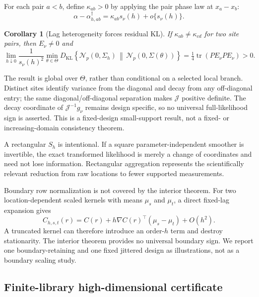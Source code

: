 \documentclass[11pt]{article}
\newtheorem{corollary}{Corollary}
\theoremstyle{remark}
\newcommand{\tr}{\operatorname{tr}}
\newcommand{\KL}{D_{\mathrm{KL}}}
\newcommand{\Normal}{\mathcal N}
\begin{document}
For each pair \(a<b\), define \(\kappa_{ab}>0\) by applying the pair phase law
at \(x_a-x_b\):
\begin{equation}
 \alpha-\alpha_{h,ab}^\dagger
 =\kappa_{ab}s_\nu(h)+o\{s_\nu(h)\}.
 \label{eq:finite-pair-coefficient}
\end{equation}
\begin{corollary}[Lag heterogeneity forces residual KL]
\label{cor:full-likelihood-lag-heterogeneity}
If \(\kappa_{ab}\ne\kappa_{cd}\) for two site pairs, then \(E_\nu\ne0\) and
\begin{equation}
 \lim_{h\downarrow0}\frac{1}{s_\nu(h)^2}
 \min_{\theta\in\Theta}\KL\!\left\{\Normal_p(0,\Sigma_h)\,\middle\|\,
 \Normal_p(0,\Sigma(\theta))\right\}
 =\tfrac14\tr(PE_\nu PE_\nu)>0.
 \label{eq:finite-positive-full-kl}
\end{equation}
\end{corollary}

The result is global over \(\Theta\), rather than conditional on a selected
local branch. Distinct sites identify variance from the diagonal and decay
from any off-diagonal entry; the same diagonal/off-diagonal separation makes
\(\mathcal J\) positive definite. The decay coordinate of
\(\mathcal J^{-1}g_\nu\) remains design specific, so no universal
full-likelihood sign is asserted. This is a fixed-design small-support result,
not a fixed- or increasing-domain consistency theorem.

A rectangular \(S_h\) is intentional.  If a square parameter-independent
smoother is invertible, the exact transformed likelihood is merely a change of
coordinates and need not lose information.  Rectangular aggregation represents
the scientifically relevant reduction from raw locations to fewer supported
measurements.

Boundary row normalization is not covered by the interior theorem.  For two
location-dependent scaled kernels with means \(\mu_s\) and \(\mu_t\), a direct
fixed-lag expansion gives
\begin{equation}
  C_{h,s,t}(r)
  =C(r)+h\nabla C(r)^\top(\mu_s-\mu_t)+O(h^2).
  \label{eq:boundary-first-order}
\end{equation}
A truncated kernel can therefore introduce an order-\(h\) term and destroy
stationarity.  The interior theorem provides no universal boundary sign.  We
report one boundary-retaining and one fixed jittered design as illustrations,
not as a boundary scaling study.

\subsection{Finite-library high-dimensional certificate}
\end{document}
